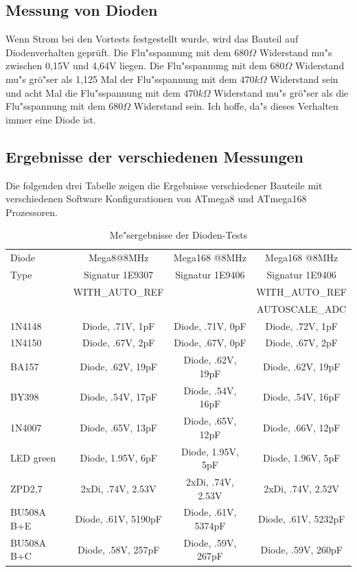 \subsection{Messung von Dioden}
\label{sec:diode}
Wenn Strom bei den Vortests festgestellt wurde, wird das Bauteil auf Diodenverhalten gepr\"uft.
Die Flu"sspannung mit dem \(680\Omega\) Widerstand mu"s zwischen 0,15V und 4,64V liegen.
Die Flu"sspannung mit dem \(680\Omega\) Widerstand mu"s gr\"o"ser als 1,125 Mal der Flu"sspannung mit dem
 \(470k\Omega\) Widerstand sein und acht Mal die Flu"sspannung mit dem \(470k\Omega\) Widerstand mu"s
gr\"o"ser als die Flu"sspannung mit dem \(680\Omega\) Widerstand sein.
Ich hoffe, da"s dieses Verhalten immer eine Diode ist.

\subsection{Ergebnisse der verschiedenen Messungen}
Die folgenden drei Tabelle zeigen die Ergebnisse verschiedener Bauteile mit
verschiedenen Software Konfigurationen von ATmega8 und ATmega168 Prozessoren.

\begin{table}[H]
  \begin{center}
    \begin{tabular}{| l | c | c | c |}
    \hline
     Diode & Mega8@8MHz      & Mega168 @8MHz   & Mega168 @8MHz \\
     Type  & Signatur 1E9307 & Signatur 1E9406 & Signatur 1E9406 \\
           & WITH\_AUTO\_REF &                 & WITH\_AUTO\_REF \\
           &                 &                 & AUTOSCALE\_ADC \\
    \hline
    \hline
1N4148 & Diode, .71V, 1pF & Diode, .71V, 0pF & Diode, .72V, 1pF\\
    \hline
1N4150 & Diode, .67V, 2pF & Diode, .67V, 0pF & Diode, .67V, 2pF\\
    \hline
BA157 & Diode, .62V, 19pF & Diode, .62V, 19pF & Diode, .62V, 19pF\\
    \hline
BY398 & Diode, .54V, 17pF & Diode, .54V, 16pF & Diode, .54V, 16pF\\
    \hline
1N4007 & Diode, .65V, 13pF & Diode, .65V, 12pF & Diode, .66V, 12pF\\
    \hline
LED green & Diode, 1.95V, 6pF & Diode, 1.95V, 5pF & Diode, 1.96V, 5pF\\
    \hline
ZPD2,7 & 2xDi, .74V, 2.53V & 2xDi, .74V, 2.53V & 2xDi, .74V, 2.52V \\
    \hline
BU508A B+E & Diode, .61V, 5190pF & Diode, .61V, 5374pF & Diode, .61V, 5232pF\\
    \hline
BU508A B+C & Diode, .58V, 257pF & Diode, .59V, 267pF & Diode, .59V, 260pF\\
    \hline
    \end{tabular}
  \end{center}
  \caption{Me"sergebnisse der Dioden-Tests}
  \label{tab:diodes} 
\end{table}

